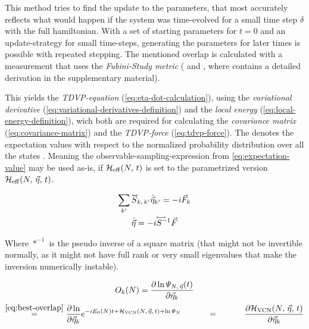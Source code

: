 This method tries to find the update to the parameters, that most accurately reflects what would happen if the system was time-evolved for a small time step $\delta$ with the full hamiltonian.
With a set of starting parameters for $t=0$ and an update-strategy for small time-steps, generating the parameters for later times is possible with repeated stepping.
The mentioned overlap is calculated with a measurement that uses the \emph{Fubini-Study metric} (\cite{variationalClassicalNetworksPaper} and \cite{probabilitySamplingRequirementVCN}, where \cite{probabilitySamplingRequirementVCN} contains a detailed derivation in the supplementary material).

This yields the \emph{TDVP-equation} (\autoref{eq:eta-dot-calculation}), using the \emph{variational derivative} (\autoref{eq:variational-derivatives-definition}) and the \emph{local energy} (\autoref{eq:local-energy-definition}), wich both are required for calculating the \emph{covariance matrix} (\autoref{eq:covariance-matrix}) and the \emph{TDVP-force} (\autoref{eq:tdvp-force}).
The \etaExpectationVal{\ast} denotes the expectation values with respect to the normalized probability distribution over all the states  \cite{probabilitySamplingRequirementVCN}.
Meaning the observable-sampling-expression from \autoref{eq:expectation-value} may be used as-is, if $\HeffOft$ is set to the parametrized version $\HeffOft[N,\,\vec{\eta}]$.

\begin{equation}
    \label{eq:eta-dot-calculation}
    \begin{gathered}
        \lsum[k'] \matvec{S}_{k,\, k'} \dot{\vec{\eta}}_{k'} = -i \vec{F}_k\\
        \dot{\vec{\eta}} = -i \matvec{S^{-1}} \vec{F}
    \end{gathered}
\end{equation}

Where $\ast^{-1}$ is the pseudo inverse of a square matrix (that might not be invertible normally, as it might not have full rank or very small eigenvalues that make the inversion numerically instable).

\begin{equation}
    \label{eq:variational-derivatives-definition}
    \begin{gathered}
        O_{k}(N) = \frac{\partial \ln \psiEta{N,\,\vec{\eta}}{t}}{\partial \vec{\eta}_k}\\
        \stackrel{\ref{eq:best-overlap}}{=} \frac{\partial \ln }{\partial \vec{\eta}_k} e^{-i E_0(N) t + \HvcnOft{\vec{\eta}} + \ln \psiN} 
        \stackrel{\phantom{\ref{eq:best-overlap}}}{=} 
        \frac{\partial \HvcnOft{\vec{\eta}} }{\partial \vec{\eta}_k} 
    \end{gathered}
\end{equation}

